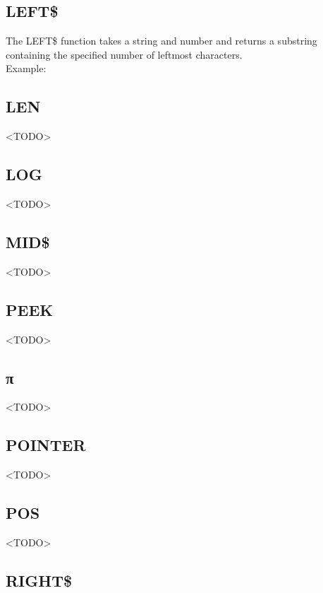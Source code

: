 \subsection{LEFT\$}

The {\ttfamily LEFT\$} function takes a string and number and returns a
substring containing the specified number of leftmost characters.\\

Example:\\


\subsection{LEN}

<TODO>

\subsection{LOG}

<TODO>

\subsection{MID\$}

<TODO>

\subsection{PEEK}

<TODO>

\subsection{\ttfamily π}

<TODO>

\subsection{POINTER}

<TODO>

\subsection{POS}

<TODO>

\subsection{RIGHT\$}

